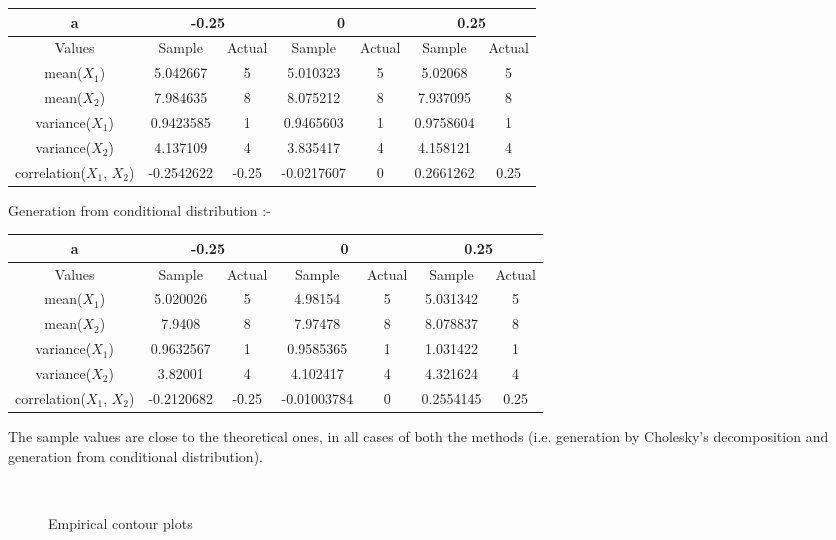 \documentclass[11pt]{article}
\begin{document}
\begin{center}
	\begin{tabular}{||c || c c | c c | c c||}
	\hline
		a & \multicolumn{2}{c}{-0.25} & \multicolumn{2}{|c}{0} & \multicolumn{2}{|c||}{0.25}\\
	\hline
		Values & Sample & Actual & Sample & Actual & Sample & Actual\\
	\hline
		mean($X_1$) & 5.042667 & 5 & 5.010323 & 5 & 5.02068 & 5\\
		mean($X_2$) & 7.984635 & 8 & 8.075212 & 8 & 7.937095 & 8\\
		variance($X_1$) & 0.9423585 & 1 & 0.9465603 & 1 & 0.9758604 & 1\\
		variance($X_2$) & 4.137109 & 4 & 3.835417 & 4 & 4.158121 & 4\\
		correlation($X_1$, $X_2$) & -0.2542622 & -0.25 & -0.0217607 & 0 & 0.2661262 & 0.25\\
	\hline
	\end{tabular}
\end{center}

Generation from conditional distribution :-
\begin{center}
	\begin{tabular}{||c || c c | c c | c c||}
	\hline
		a & \multicolumn{2}{c}{-0.25} & \multicolumn{2}{|c}{0} & \multicolumn{2}{|c||}{0.25}\\
	\hline
		Values & Sample & Actual & Sample & Actual & Sample & Actual\\
	\hline
		mean($X_1$) & 5.020026 & 5 & 4.98154 & 5 & 5.031342 & 5\\
		mean($X_2$) & 7.9408 & 8 & 7.97478 & 8 & 8.078837 & 8\\
		variance($X_1$) & 0.9632567 & 1 & 0.9585365 & 1 & 1.031422 & 1\\
		variance($X_2$) & 3.82001 & 4 & 4.102417 & 4 & 4.321624 & 4\\
		correlation($X_1$, $X_2$) & -0.2120682 & -0.25 & -0.01003784 & 0 & 0.2554145 & 0.25\\
	\hline
	\end{tabular}
\end{center}

The sample values are close to the theoretical ones, in all cases of both the methods (i.e. generation by Cholesky's decomposition and generation from conditional distribution).

\begin{figure}[H]
	\centering
	\hspace{5mm}
	\\
		\caption{Empirical contour plots}
\end{figure}
\end{document}
